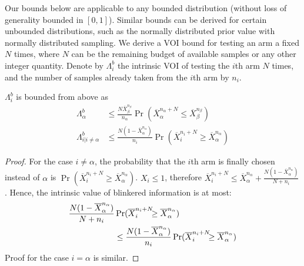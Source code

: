 Our bounds below are applicable to any bounded distribution (without loss of generality 
bounded in $[0,1]$). Similar
bounds can be derived for certain unbounded distributions, such as the
normally distributed prior value with normally distributed
sampling.
We derive a VOI bound for testing an arm a fixed $N$ times,
where $N$ can be the remaining budget of available samples or
any other integer quantity.
Denote by  $\Lambda_i^b$ the intrinsic VOI of testing the $i$th arm
$N$ times, and the number of
samples already taken from the $i$th arm by $n_i$.
\begin{thm} $\Lambda_i^b$ is bounded from above as
\begin{align}
\label{eqn:thm-be}
  \Lambda_\alpha^b&\le \frac {N \overline X_\beta^{n_\beta}} {n_\alpha} \Pr(\overline X_\alpha^{n_\alpha+N}\le\overline X_\beta^{n_\beta})\nonumber\\
\Lambda_{i|i\ne\alpha}^b&\le \frac {N(1-\overline X_\alpha^{n_\alpha})} {n_i}\Pr(\overline   X_i^{{n_i}+N}\ge\overline X_\alpha^{n_\alpha})
\end{align}
\vspace{-24pt}
\label{thm:be}
\end{thm}
\begin{proof} For the case $i\ne \alpha$, the probability that the
	  $i$th arm is finally chosen instead of $\alpha$ is
	  $\Pr(\overline X_i^{n_i+N} \ge \overline X_\alpha^{n_\alpha})$. $X_i \le 1$,
	  therefore $\overline X_i^{n_i+N}\le \overline
	  X_\alpha^{n_\alpha}+\frac {N(1-\overline X_\alpha^{n_\alpha})} {N+n_i}$. Hence, the intrinsic value of blinkered
	  information is at most: 
	\begin{align}
	\label{eq:simplistic}
	\frac{ N(1-\overline  X_\alpha^{n_\alpha})}
	  {N+n_i}&\Pr(\overline X_i^{{n_i}+N}\hspace{-0.5em}\ge\overline X_\alpha^{n_\alpha})\nonumber \\
	&\le\frac{ N(1-\overline  X_\alpha^{n_\alpha})}
	{n_i}\Pr(\overline X_i^{{n_i}+N}\hspace{-0.5em}\ge\overline X_\alpha^{n_\alpha})
	\end{align}
	  Proof for the case $i=\alpha$ is similar.
\end{proof}


